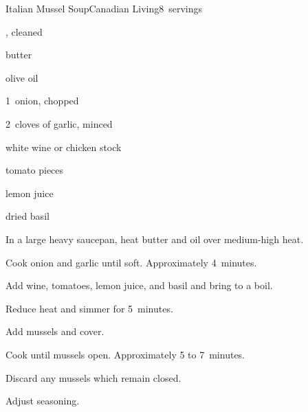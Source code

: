\begin{recipe}{Italian Mussel Soup}{Canadian Living}{8~servings}

\begin{ingredients}
\item {} , cleaned
\item {} butter
\item {} olive oil
\item 1~onion, chopped
\item 2~cloves of garlic, minced
\item {} white wine or chicken stock
\item {} tomato pieces
\item {} lemon juice
\item \tp{1\half} dried basil
\end{ingredients}

\begin{directions}
\item In a large heavy saucepan, heat butter and oil over medium-high heat.
\item Cook onion and garlic until soft. Approximately 4~minutes.
\item Add wine, tomatoes, lemon juice, and basil and bring to a boil.
\item Reduce heat and simmer for 5~minutes.
\item Add mussels and cover.
\item Cook until mussels open. Approximately 5 to 7~minutes.
\item Discard any mussels which remain closed.
\item Adjust seasoning.
\end{directions}

\end{recipe}
